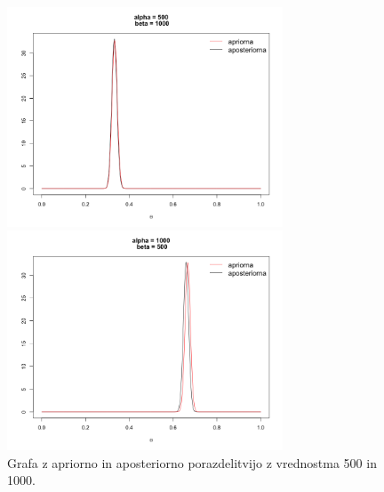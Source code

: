 \documentclass[a4paper,11pt]{article}
\begin{document}
\begin{figure}[ht!]
    \begin{minipage}{0.5\textwidth}
        \centering
        \includegraphics[width=82mm]{Slike/1_10.png}
    \end{minipage}\hfill
    \begin{minipage}{0.5\textwidth}
        \centering
        \includegraphics[width=82mm]{Slike/1_11.png}
    \end{minipage}\hfill
    \caption{Grafa z apriorno in aposteriorno porazdelitvijo z vrednostma 500 in 1000.}
\end{figure}
\end{document}
